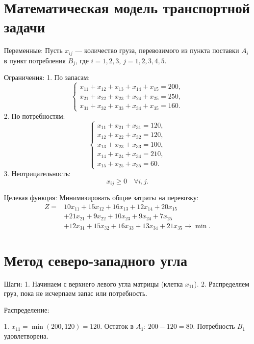 \documentclass{article}
\begin{document}
\section{Математическая модель транспортной задачи}

Переменные:  
Пусть \( x_{ij} \) — количество груза, перевозимого из пункта поставки \( A_i \) в пункт потребления \( B_j \), где \( i = 1, 2, 3 \), \( j = 1, 2, 3, 4, 5 \).

Ограничения:  
1. По запасам:  
   \[
   \begin{cases}
   x_{11} + x_{12} + x_{13} + x_{14} + x_{15} = 200, \\
   x_{21} + x_{22} + x_{23} + x_{24} + x_{25} = 250, \\
   x_{31} + x_{32} + x_{33} + x_{34} + x_{35} = 160.
   \end{cases}
   \]
2. По потребностям:  
   \[
   \begin{cases}
   x_{11} + x_{21} + x_{31} = 120, \\
   x_{12} + x_{22} + x_{32} = 120, \\
   x_{13} + x_{23} + x_{33} = 100, \\
   x_{14} + x_{24} + x_{34} = 210, \\
   x_{15} + x_{25} + x_{35} = 60.
   \end{cases}
   \]
3. Неотрицательность:  
   \[
   x_{ij} \geq 0 \quad \forall i, j.
   \]

Целевая функция:  
Минимизировать общие затраты на перевозку:  
\begin{align}
   Z = &10x_{11} + 15x_{12} + 16x_{13} + 12x_{14} + 20x_{15} \nonumber \\
       &+ 21x_{21} + 9x_{22} + 10x_{23} + 9x_{24} + 7x_{25} \nonumber \\
       &+ 12x_{31} + 15x_{32} + 16x_{33} + 13x_{34} + 21x_{35} \to \min.
\end{align}

\section{Метод северо-западного угла}

Шаги:  
1. Начинаем с верхнего левого угла матрицы (клетка \( x_{11} \)).  
2. Распределяем груз, пока не исчерпаем запас или потребность.  

Распределение:  

1. \( x_{11} = \min(200, 120) = 120 \).  
   Остаток в \( A_1 \): \( 200 - 120 = 80 \).  
   Потребность \( B_1 \) удовлетворена.  
\end{document}
